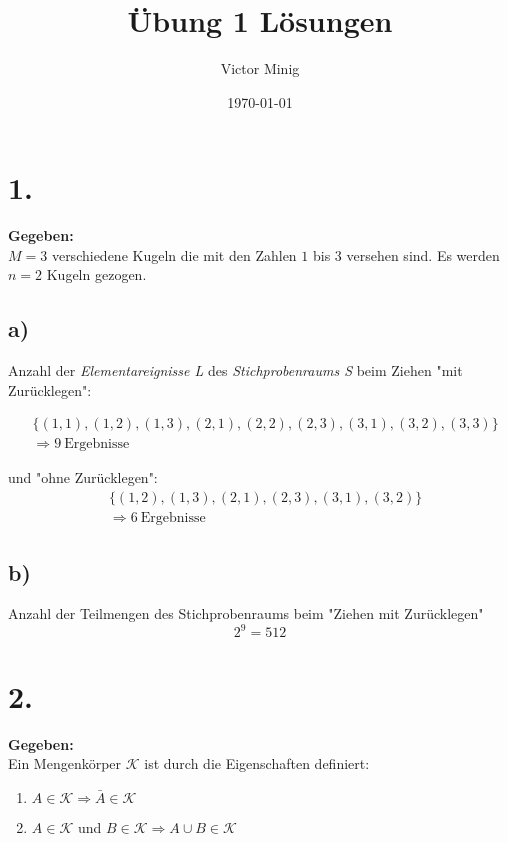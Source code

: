 \documentclass{article}
\begin{document}
\title{Übung 1 Lösungen}
\author{Victor Minig}
\date{\today}
\maketitle

\section*{1.}
\textbf{Gegeben:} \\

$M = 3$ verschiedene Kugeln die mit den Zahlen $1$ bis $3$ versehen sind. Es werden $n=2$ Kugeln gezogen. 
\subsection*{   a)} 

    Anzahl der \textit{Elementareignisse L} des \textit{Stichprobenraums S} beim Ziehen "mit Zurücklegen":

\begin{align*}
    &\{(1,1), (1,2),(1,3), (2,1), (2,2), (2,3), (3,1), (3,2), (3,3)\} \\
    & \Longrightarrow 9 ~ \text{Ergebnisse}
\end{align*}

und "ohne Zurücklegen":
\begin{align*}
    &\{(1,2),(1,3), (2,1), (2,3), (3,1), (3,2)\} \\
    & \Longrightarrow 6 ~ \text{Ergebnisse}
\end{align*}
\subsection*{   b)}
    Anzahl der Teilmengen des Stichprobenraums beim "Ziehen mit Zurücklegen"
\[
    2^{9} =  512
\]

\section*{2.}
\textbf{Gegeben:} \\

Ein Mengenkörper $\mathcal{K}$ ist durch die Eigenschaften definiert: 
\begin{enumerate}
    \item $A \in \mathcal{K} \Rightarrow \bar{A} \in \mathcal{K}$
    \item  $A \in \mathcal{K}$ und $B \in \mathcal{K} \Rightarrow A \cup B \in \mathcal{K}$
\end{enumerate}
\end{document}
